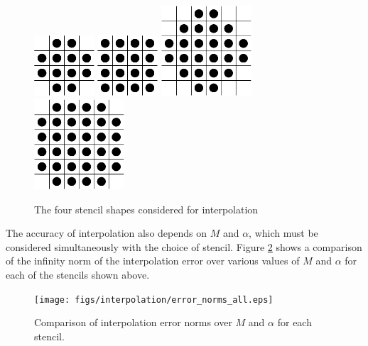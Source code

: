\documentclass{report}
\begin{document}
\begin{figure}[h!]
  \begin{center}
    \includegraphics[width=0.2\textwidth]{figs/stencils/4x4_no_corners_centered.eps}
    \hspace{1.5 cm}
    \includegraphics[width=0.2\textwidth]{figs/stencils/4x4_centered.eps}
    \linebreak
    \linebreak
    \includegraphics[width=0.3\textwidth]{figs/stencils/4x4+2_centered.eps}
    \hspace{0.4 cm}
    \includegraphics[width=0.3\textwidth]{figs/stencils/6x6_no_corners_centered.eps}
    \caption{The four stencil shapes considered for interpolation}
    \label{fig:stencils}
  \end{center}
\end{figure}

The accuracy of interpolation also depends on $M$ and $\alpha$, which must be considered simultaneously with the choice of stencil. Figure \ref{fig:errors_all} shows a comparison of the infinity norm of the interpolation error over various values of $M$ and $\alpha$ for each of the stencils shown above.

\begin{figure}[h!]
  \begin{center}
    \texttt{[image: figs/interpolation/error\_norms\_all.eps]}
    \caption{Comparison of interpolation error norms over $M$ and $\alpha$ for each stencil.}
    \label{fig:errors_all}
  \end{center}
\end{figure}




\end{document}
